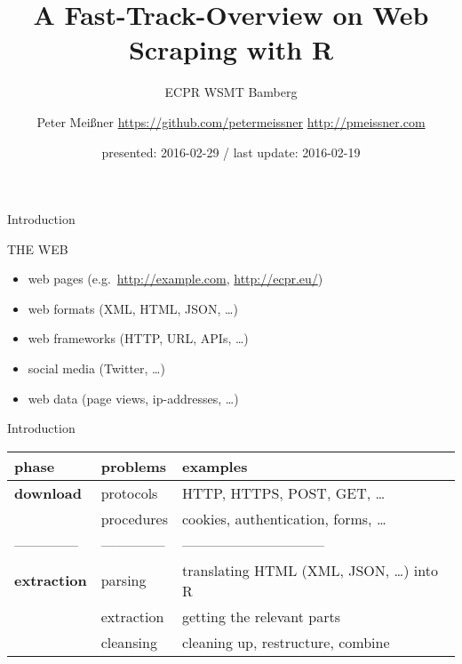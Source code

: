 \documentclass[9pt,ignorenonframetext,]{beamer}
\title{A Fast-Track-Overview on Web Scraping with R}
\subtitle{ECPR WSMT Bamberg}
\author{Peter Meißner \newline \newline \url{https://github.com/petermeissner}
\newline \url{http://pmeissner.com} \newline}
\date{presented: 2016-02-29 / last update: 2016-02-19}
\providecommand{\tightlist}{%
  \setlength{\itemsep}{0pt}\setlength{\parskip}{0pt}}
\begin{document}
\frame{\titlepage}

\begin{frame}{Introduction}

THE WEB

\begin{itemize}
\tightlist
\item
  web pages (e.g.~\url{http://example.com}, \url{http://ecpr.eu/})
\item
  web formats (XML, HTML, JSON, \ldots{})
\item
  web frameworks (HTTP, URL, APIs, \ldots{})
\item
  social media (Twitter, \ldots{})
\item
  web data (page views, ip-addresses, \ldots{})
\end{itemize}

\end{frame}

\begin{frame}{Introduction}

\begin{longtable}[c]{@{}lll@{}}
\toprule
\textbf{phase} & \textbf{problems} & \textbf{examples}\tabularnewline
\midrule
\endhead
\textbf{download} & protocols & HTTP, HTTPS, POST, GET,
\ldots{}\tabularnewline
~ & procedures & cookies, authentication, forms, \ldots{}\tabularnewline
-------------- & -------------- &
------------------------------\tabularnewline
\textbf{extraction} & parsing & translating HTML (XML, JSON, \ldots{})
into R\tabularnewline
~ & extraction & getting the relevant parts\tabularnewline
~ & cleansing & cleaning up, restructure, combine\tabularnewline
\bottomrule
\end{longtable}

\end{frame}
\end{document}
